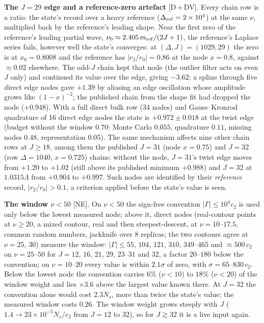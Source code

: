 \documentclass[aps,prl,onecolumn,superscriptaddress,nofootinbib]{revtex4-2}
\begin{document}
\textbf{The $J=29$ edge and a reference-zero artefact} [D\,+\,DV]. Every chain row is a ratio: the state's
record over a heavy reference ($\Delta_{\rm ref}=2\times10^4$) at the same $\nu$, multiplied back by the
reference's leading shape. Near the first zero of the reference's leading partial wave,
$\nu_0\approx2.405\,m_{\rm ref}/(2J+1)$, the reference's Laplace series fails, however well the state's
converges: at $(\Delta,J)=(1029,29)$ the zero is at $x_0=0.8008$ and the reference has $|r_2/r_0|=0.86$ at the
node $x=0.8$, against $\approx0.02$ elsewhere. The odd-$J$ chain kept that node (the outlier filter acts on
even $J$ only) and continued its value over the edge, giving $-3.62$; a spline through five direct edge nodes gave
$+1.39$ by aliasing an edge oscillation whose amplitude grows like $(1-x)^{-2}$; the published chain from the shape fit had
dropped the node ($+0.948$). With a full direct bulk row (34 nodes) and Gauss--Kronrod quadrature of 16 direct
edge nodes the state is $+0.972\pm0.018$ at the twist edge (budget without the window $0.70$: Monte Carlo
$0.055$, quadrature $0.11$, missing nodes $0.48$, representation $0.05$). The same mechanism affects nine other
chain rows at $J\ge18$, among them the published $J=31$ (node $x=0.75$) and $J=32$ (row $\Delta=1040$, $x=0.725$)
chains: without the node, $J=31$'s twist edge moves from $+1.20$ to $+1.02$ (still above its published minimum
$+0.988$) and $J=32$ at $1.0315\Lambda$ from $+0.904$ to $+0.997$. Such nodes are identified by their \emph{reference} record, $|r_2/r_0|>0.1$, a criterion applied before the state's value is seen.

\textbf{The window $\nu<50$} [NE]. On $\nu<50$ the sign-free convention $|\Gamma|\le10^4c_2$ is used only below the lowest measured node; above it, direct nodes (real-contour points at $\nu\ge20$, a mixed contour, real and then steepest-descent, at $\nu=10$--$17.5$,
common random numbers, jackknife over 8 replicas; the two contours agree at $\nu=25$, $30$) measure the window:
$|\Gamma|\le55$, $104$, $121$, $310$, $349$--$465$ and $\approx500\,c_2$ on $\nu=25$--$50$ for $J=12$, $16$, $21$, $29$,
$23$--$31$ and $32$, a factor $20$--$180$ below the convention; on $\nu=10$--$20$ every value is within $2.1\sigma$ of
zero, with $\sigma=65$--$830\,c_2$. Below the lowest node the convention carries
$6\%$ ($\nu<10$) to $18\%$ ($\nu<20$) of the window weight and lies $\times3.6$ above the largest value known there.
At $J=32$ the convention alone would cost $2.3N_s$, more than twice the state's value; the measured window costs
$0.26$. The window weight grows steeply with $J$ ($1.4\to23\times10^{-5}N_s/c_2$ from $J=12$ to $32$), so for
$J\gtrsim32$ it is a live input again. 
\end{document}

